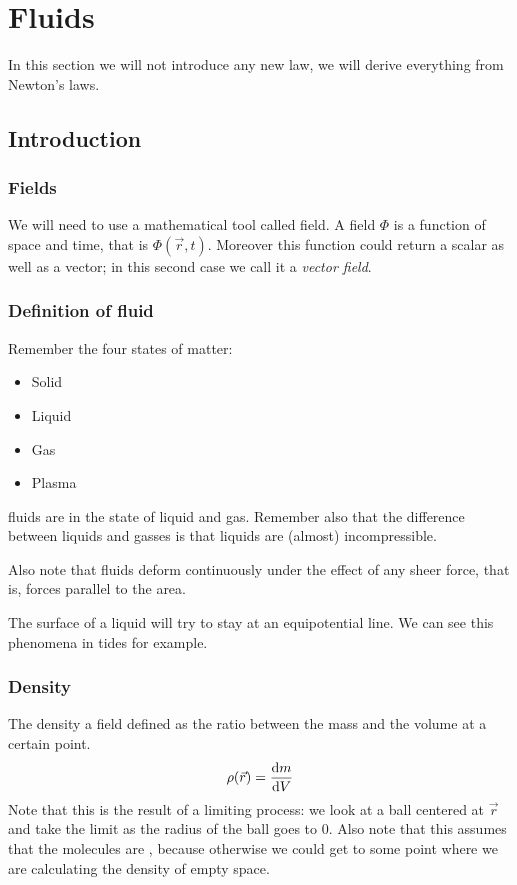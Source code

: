 \documentclass[12pt]{extarticle}
\begin{document}
\section{Fluids}

In this section we will not introduce any new law, we will derive everything from Newton's laws.

\subsection{Introduction}

\subsubsection{Fields}

We will need to use a mathematical tool called field.
A field $\Phi$ is a function of space and time, that is $\Phi(\vec{r}, t)$.
Moreover this function could return a scalar as well as a vector; in this second case we call it a \emph{vector field}.

\subsubsection{Definition of fluid}

Remember the four states of matter:
\begin{itemize}
    \item Solid
    \item Liquid
    \item Gas
    \item Plasma
\end{itemize}
fluids are in the state of liquid and gas.
Remember also that the difference between liquids and gasses is that liquids are (almost) incompressible.

Also note that fluids deform continuously under the effect of any sheer force, that is, forces parallel to the area.

The surface of a liquid will try to stay at an equipotential line. We can see this phenomena in tides for example.

\subsubsection{Density}

The density a field defined as the ratio between the mass and the volume at a certain point.
\begin{equation}
    \rho(\vec r) = \dv{m}{V}
\end{equation}
Note that this is the result of a limiting process: we look at a ball centered at $\vec r$ and take the limit as the radius of the ball goes to $0$.
Also note that this assumes that the molecules are , because otherwise we could get to some point where we are calculating the density of empty space.
\end{document}
